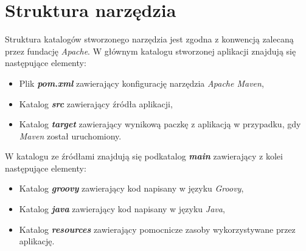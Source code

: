 \documentclass[11pt,a4paper]{article}
\begin{document}
\section{Struktura narzędzia}\label{solution:structure}
Struktura katalogów stworzonego narzędzia jest zgodna z konwencją zalecaną przez fundację \emph{Apache}. W głównym katalogu stworzonej aplikacji znajdują się następujące elementy:
\begin{itemize}
	\item Plik \emph{\textbf{pom.xml}} zawierający konfigurację narzędzia \emph{Apache Maven},
	\item Katalog \emph{\textbf{src}} zawierający źródła aplikacji,
	\item Katalog \emph{\textbf{target}} zawierający wynikową paczkę z aplikacją w przypadku, gdy \emph{Maven} został uruchomiony. 
\end{itemize}


W katalogu ze źródłami znajdują się podkatalog \emph{\textbf{main}} zawierający z kolei następujące elementy:
\begin{itemize}
	\item Katalog \emph{\textbf{groovy}} zawierający kod napisany w języku \emph{Groovy},
	\item Katalog \emph{\textbf{java}} zawierający kod napisany w języku \emph{Java},
	\item Katalog \emph{\textbf{resources}} zawierający pomocnicze zasoby wykorzystywane przez aplikację.
\end{itemize}
\end{document}
